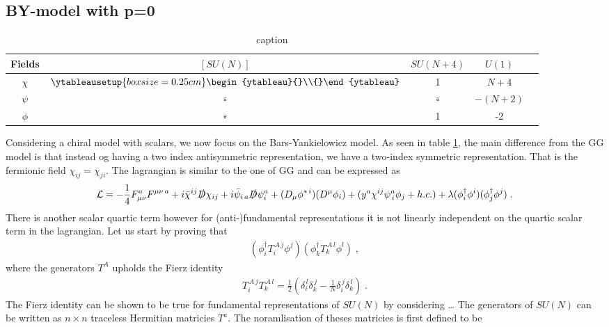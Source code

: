 \subsection{BY-model with p=0}
\begin{table}[h] 
    \centering 
    \begin{tabular}{|c|c|c|c|c|} \hline Fields & $[SU(N)]$ & $SU(N+4)$  & $U(1)$ \\ \hline $\chi$ & $\ytableausetup{boxsize=0.25cm}\begin{ytableau}{}\\{}\end{ytableau}$ & 1 & $N+4$ \\ $\psi$ & $\bar\square$ & $\bar\square$ & $-(N+2)$ \\ \hline $\phi$ & $\bar\square$ & 1  & -2 \\ \hline 
    \end{tabular} 
    \caption{ caption} 
    \label{tab:BYp0} 
\end{table}
Considering a chiral model with scalars, we now focus on the Bars-Yankielowicz model. As seen in table \ref{tab:BYp0}, the main difference from the GG model is that instead og having a two index antisymmetric representation, we have a two-index symmetric representation. That is the fermionic field $\chi_{ij}=\chi_{ji}$. The lagrangian is similar to the one of GG and can be expressed as
 \begin{align*}\mathcal{L}= -\frac{1}{4} F_{\mu\nu}^a F^{\mu\nu\,a}+i \bar \chi^{ij}\slashed{D}\chi_{ij}+i \bar \psi_{i\,a}\slashed{D}\psi_i^a+(D_\mu \phi^{*\,i})(D^\mu\phi_i)+(y^a\chi^{ij} \psi ^a_{\, i} \phi_j + h.c.)+\lambda (\phi^{\dagger}_i \phi^i)( \phi^{\dagger}_j \phi^j )
    \;.
 \end{align*}
There is another scalar quartic term however for (anti-)fundamental representations it is not linearly independent on the quartic scalar term in the lagrangian. Let us start by proving that 
\begin{align}
    (\phi_i^\dagger T_i ^{\,A\,j}\phi^j)(\phi_k^\dagger T_k ^{\,A\,l}\phi^l)\;,
\end{align}
where the generators $T^A$ upholds the Fierz identity
\begin{align}
    T_i ^{\,A\,j}T_k ^{\,A\,l}=\frac{1}{2}\left(\delta_i^{\,l}\delta_k^{\,j}-\frac{1}{N}\delta_i^{\,j}\delta_k^{\,l}\right) \;.
\end{align}
The Fierz identity can be shown to be true for fundamental representations of $SU(N)$ by considering \dots
The generators of $SU(N)$ can be written as $n\times n $ traceless Hermitian matricies $T^a$. The noramlisation of theses matricies is first defined to be 
